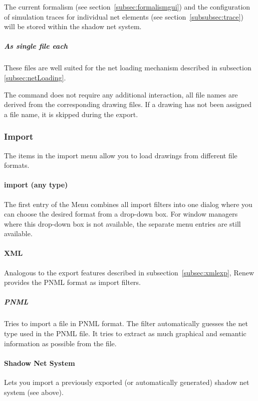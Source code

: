 The current formalism (see section~\ref{subsec:formalismgui}) and the
configuration of simulation traces for individual net elements (see
section~\ref{subsubsec:trace}) will be stored within the shadow net
system.

\subparagraph{As single file each}
These files are well suited for the net
loading mechanism described in subsection \ref{subsec:netLoading}.

The command does not require any additional interaction, all file
names are derived from the corresponding drawing files. If a
drawing has not been assigned a file name, it is skipped during
the export.

\subsubsection{Import}

The items in the import menu allow you to load drawings from
different file formats.

\paragraph{import (any type)}
The first entry of the Menu combines all import filters into 
one dialog where you can choose the desired format from a
drop-down box.
For window managers where this drop-down box is not available,
the separate menu entries are still available.

\paragraph{XML}
Analogous to the export features described in
subsection~\ref{subsec:xmlexp}, Renew provides
the PNML format as import filters.

%
%

\subparagraph{PNML}
Tries to import a file in PNML format.
The filter automatically guesses the net type used in the PNML
file.
It tries to extract as much graphical and semantic information
as possible from the file.

\paragraph{Shadow Net System}
Lets you import a previously exported (or automatically
generated) shadow net system (see above).


